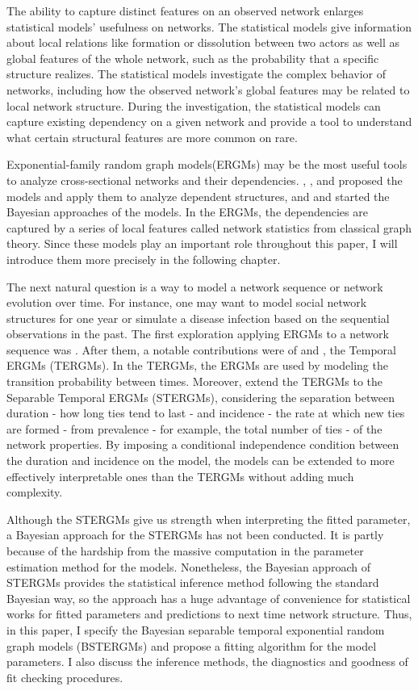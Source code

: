 \documentclass[a4paper, 11pt]{report}
\theoremstyle{definition}
\begin{document}
The ability to capture distinct features on an observed network enlarges statistical models' usefulness on networks. 
The statistical models give information about local relations like formation or dissolution between two actors 
as well as global features of the whole network, such as the probability that a specific structure realizes. 
The statistical models investigate the complex behavior of networks, 
including how the observed network's global features may be related to local network structure. 
During the investigation, the statistical models can capture existing dependency on a given network and provide a tool 
to understand what certain structural features are more common on rare.

Exponential-family random graph models(ERGMs) may be the most useful tools to analyze cross-sectional networks and their dependencies.
\cite{RN117}, \cite{RN123}, \cite{RN124} and \cite{RN122} proposed the models and apply them to analyze dependent structures, 
and \cite{RN115} and \cite{RN116} started the Bayesian approaches of the models.
In the ERGMs, the dependencies are captured by a series of local features called network statistics from classical graph theory. 
Since these models play an important role throughout this paper, I will introduce them more precisely in the following chapter.

The next natural question is a way to model a network sequence or network evolution over time. 
For instance, one may want to model social network structures for one year or 
simulate a disease infection based on the sequential observations in the past. 
The first exploration applying ERGMs to a network sequence was \cite{RN109}. 
After them, a notable contributions were of \cite{RN125} and \cite{RN126}, the Temporal ERGMs (TERGMs). 
In the TERGMs, the ERGMs are used by modeling the transition probability between times. 
Moreover, \cite{RN93} extend the TERGMs to the Separable Temporal ERGMs (STERGMs), 
considering the separation between duration - how long ties tend to last - and 
incidence - the rate at which new ties are formed - from 
prevalence - for example, the total number of ties - of the network properties. 
By imposing a conditional independence condition between the duration and incidence on the model, 
the models can be extended to more effectively interpretable ones than the TERGMs 
without adding much complexity.

Although the STERGMs give us strength when interpreting the fitted parameter, 
a Bayesian approach for the STERGMs has not been conducted. 
It is partly because of the hardship from the massive computation in the parameter estimation method for the models. 
Nonetheless, the Bayesian approach of STERGMs provides the statistical inference method following the standard Bayesian way, 
so the approach has a huge advantage of convenience for statistical works for fitted parameters and predictions to next time network structure. 
Thus, in this paper, I specify the Bayesian separable temporal exponential random graph models (BSTERGMs) and propose a fitting algorithm for the model parameters.
I also discuss the inference methods, the diagnostics and goodness of fit checking procedures.
\end{document}
